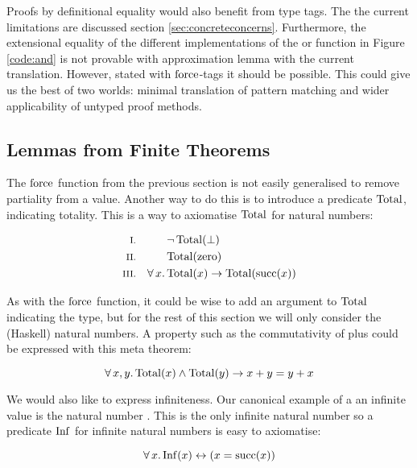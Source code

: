 Proofs by definitional equality would also benefit from type tags. The
the current limitations are discussed section
\ref{sec:concreteconcerns}. Furthermore, the extensional equality of
the different implementations of the or function in Figure
\ref{code:and} is not provable with approximation lemma with the
current translation. However, stated with $\mathrm{force}$-tags it should
be possible. This could give us the best of two worlds: minimal
translation of pattern matching and wider applicability of untyped
proof methods.

\subsection{Lemmas from Finite Theorems}
\label{sec:total}

\newcommand\Inf{\fn{Inf}}
\newcommand\Total{\fn{Total}}
\newcommand\Fin{\fn{Fin}}
The $\mathrm{force}$ function from the previous section is not easily
generalised to remove partiality from a value. Another way to do this
is to introduce a predicate $\Total$, indicating totality. This is a
way to axiomatise $\Total$ for natural numbers:

\begin{align*}
\rom{1} &&        & \neg \, \Total(\bot) \\
\rom{2} &&        & \Total(\fn{zero}) \\
\rom{3} && \fa{x} & \Total(x) \rightarrow \Total(\fn{succ}(x))
\end{align*}

As with the $\mathrm{force}$ function, it could be wise to add an argument
to $\Total$ indicating the type, but for the rest of this section we
will only consider the (Haskell) natural numbers. A property such as the
commutativity of plus could be expressed with this meta theorem:

\begin{equation*}
\faa{x}{y} \Total(x) \wedge \Total(y) \rightarrow x + y = y + x
\end{equation*}

We would also like to express infiniteness. Our canonical example of a
an infinite value is the natural number . This is
the only infinite natural number so a predicate $\Inf$ for infinite
natural numbers is easy to axiomatise:

\begin{equation*}
\fa{x} \Inf(x) \leftrightarrow (x = \fn{succ}(x))
\end{equation*}

